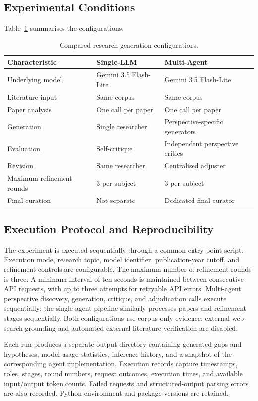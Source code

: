 \documentclass[sigconf,review,anonymous=false]{acmart}
\begin{document}
\subsection{Experimental Conditions}
Table~\ref{tab:conditions} summarises the configurations.
\begin{table}[t]
\caption{Compared research-generation configurations.}
\label{tab:conditions}
\centering\small
\begin{tabularx}{\columnwidth}{lXX}
\toprule
Characteristic & Single-LLM & Multi-Agent \\
\midrule
Underlying model & Gemini 3.5 Flash-Lite & Gemini 3.5 Flash-Lite \\
Literature input & Same corpus & Same corpus \\
Paper analysis & One call per paper & One call per paper \\
Generation & Single researcher & Perspective-specific generators \\
Evaluation & Self-critique & Independent perspective critics \\
Revision & Same researcher & Centralised adjuster \\
Maximum refinement rounds & 3 per subject & 3 per subject \\
Final curation & Not separate & Dedicated final curator \\
\bottomrule
\end{tabularx}
\end{table}

\subsection{Execution Protocol and Reproducibility}
The experiment is executed sequentially through a common entry-point script. Execution mode, research topic, model identifier, publication-year cutoff, and refinement controls are configurable. The maximum number of refinement rounds is three. A minimum interval of ten seconds is maintained between consecutive API requests, with up to three attempts for retryable API errors. Multi-agent perspective discovery, generation, critique, and adjudication calls execute sequentially; the single-agent pipeline similarly processes papers and refinement stages sequentially. Both configurations use corpus-only evidence: external web-search grounding and automated external literature verification are disabled.

Each run produces a separate output directory containing generated gaps and hypotheses, model usage statistics, inference history, and a snapshot of the corresponding agent implementation. Execution records capture timestamps, roles, stages, round numbers, request outcomes, execution times, and available input/output token counts. Failed requests and structured-output parsing errors are also recorded. Python environment and package versions are retained.
\end{document}
